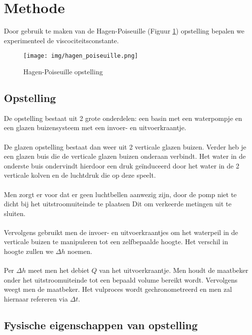 \section{Methode}

Door gebruik te maken van de Hagen-Poiseuille (Figuur \ref{fig:hagen-pois}) 
opstelling bepalen we experimenteel de viscociteitsconstante. \\

\begin{figure}[h]
    \centering
    \caption{Hagen-Poiseuille opstelling}
    \texttt{[image: img/hagen\_poiseuille.png]}
    \label{fig:hagen-pois}
\end{figure}

\subsection{Opstelling}

De opstelling bestaat uit 2 grote onderdelen: een basin
met een waterpompje en een glazen buizensysteem met
een invoer- en uitvoerkraantje.
\\ \\
De glazen opstelling bestaat dan weer uit 2 verticale 
glazen buizen. Verder heb je een glazen buis
die de verticale glazen buizen onderaan verbindt.
Het water in de onderste buis ondervindt hierdoor een druk
geïnduceerd door het water in de 2 verticale kolven en de
luchtdruk die op deze speelt.
\\ \\
Men zorgt er voor dat er geen luchtbellen aanwezig zijn, door
de pomp niet te dicht bij het uitstroomuiteinde te plaatsen
Dit om verkeerde metingen uit te sluiten.
\\ \\
Vervolgens gebruikt men de invoer- en uitvoerkraantjes om
het waterpeil in de verticale buizen te manipuleren tot
een zelfbepaalde hoogte. Het verschil in hoogte zullen we
$\Delta h$ noemen.
\\ \\
Per $\Delta h$ meet men het debiet $Q$ van het
uitvoerkraantje. Men houdt de maatbeker onder het uitstroomuiteinde 
tot een bepaald volume bereikt wordt.
Vervolgens weegt men de maatbeker. Het vulproces wordt gechronometreerd
en men zal hiernaar refereren via $\Delta t$.

\subsection{Fysische eigenschappen van opstelling}


